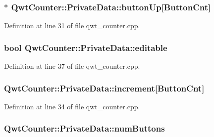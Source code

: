 \hypertarget{class_qwt_counter_1_1_private_data_af613969fc62f4c377dff9e3775b30345}{
\subsubsection[{button\-Up}]{$\ast$ Qwt\-Counter\-::\-Private\-Data\-::button\-Up\mbox{[}{\bf Button\-Cnt}\mbox{]}}}\label{class_qwt_counter_1_1_private_data_af613969fc62f4c377dff9e3775b30345}


Definition at line 31 of file qwt\-\_\-counter.\-cpp.

\hypertarget{class_qwt_counter_1_1_private_data_adcf4b5f3d63b92fd0fd22783d3e1fe2f}{
\subsubsection[{editable}]{\setlength{\rightskip}{0pt plus 5cm}bool Qwt\-Counter\-::\-Private\-Data\-::editable}}\label{class_qwt_counter_1_1_private_data_adcf4b5f3d63b92fd0fd22783d3e1fe2f}


Definition at line 37 of file qwt\-\_\-counter.\-cpp.

\hypertarget{class_qwt_counter_1_1_private_data_ad0bc014bedf552cdc97d92dafea329dd}{
\subsubsection[{increment}]{ Qwt\-Counter\-::\-Private\-Data\-::increment\mbox{[}{\bf Button\-Cnt}\mbox{]}}}\label{class_qwt_counter_1_1_private_data_ad0bc014bedf552cdc97d92dafea329dd}


Definition at line 34 of file qwt\-\_\-counter.\-cpp.

\hypertarget{class_qwt_counter_1_1_private_data_a9e148926576573156cf7740b1bfc720d}{
\subsubsection[{num\-Buttons}]{ Qwt\-Counter\-::\-Private\-Data\-::num\-Buttons}}\label{class_qwt_counter_1_1_private_data_a9e148926576573156cf7740b1bfc720d}


